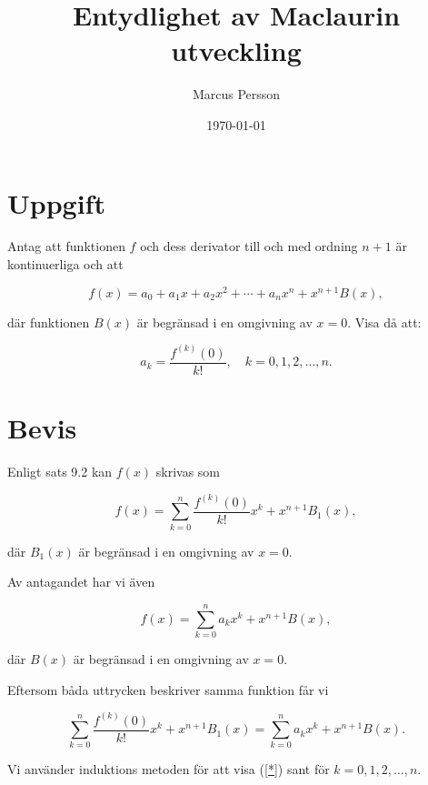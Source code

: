 \documentclass{article}
\title{Entydlighet av Maclaurin utveckling}
\author{Marcus Persson}
\date{\today}
\begin{document}
\maketitle

\section*{Uppgift}

Antag att funktionen $f$ och dess derivator
till och med ordning $n+1$ är kontinuerliga och att

\begin{equation}
\label{Maclaurin_utveckling}
    f(x) = a_0 + a_1x + a_2x^2
    + \cdots + a_nx^n + x^{n+1}B(x),
\end{equation}

\noindent där funktionen $B(x)$ är begränsad i en omgivning av $x=0$.
Visa då att:

\begin{equation}
\label{*}
    a_k = \frac{f^{(k)}(0)}{k!},
    \quad k = 0,1,2,\ldots,n.
\end{equation}


\section*{Bevis}

\noindent Enligt sats 9.2 kan $f(x)$ skrivas som

\begin{equation}
    f(x) =
    \sum_{k=0}^{n}
    \frac{f^{(k)}(0)}{k!}x^k
    + x^{n+1}B_1(x),
\end{equation}

\noindent där $B_1(x)$ är begränsad i en omgivning av $x=0$.

\noindent Av antagandet har vi även

\begin{equation}
    f(x) =
    \sum_{k=0}^{n} a_kx^k
    + x^{n+1}B(x),
\end{equation}

\noindent där $B(x)$ är begränsad i en omgivning av $x=0$.

\noindent Eftersom båda uttrycken beskriver samma funktion får vi

\begin{equation}
    \sum_{k=0}^{n}
    \frac{f^{(k)}(0)}{k!}x^k
    + x^{n+1}B_1(x)
    =
    \sum_{k=0}^{n} a_kx^k
    + x^{n+1}B(x).
\end{equation}

\noindent Vi använder induktions metoden för att visa
(\ref{*}) sant för $k=0,1,2,\ldots,n$.
\end{document}
